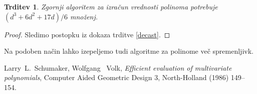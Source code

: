 \documentclass{article}
\newtheorem{trditev}{Trditev}[section]
\begin{document}
\begin{trditev}
Zgornji algoritem za izračun vrednosti polinoma potrebuje $(d^3+ 6d^2 + 17d)/6$ množenj.
\end{trditev}

\begin{proof}
Sledimo postopku iz dokaza trditve \ref{decast}.
\end{proof}

Na podoben način lahko izepeljemo tudi algoritme za polinome več spremenljivk.


\begin{thebibliography}{9}

Larry~L.~Schumaker, Wolfgang ~Volk, \emph{Efficient evaluation of multivariate
polynomials}, Computer Aided Geometric Design 3, North-Holland (1986) 149--154.

\end{thebibliography}
\end{document}

